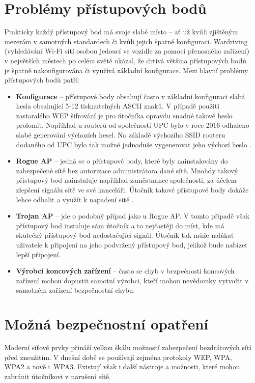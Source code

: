 \section{Problémy přístupových bodů}
Prakticky každý přístupový bod má svoje slabé místo -- ať už kvůli zjištěným mezerám v samotných standardech či kvůli jejich špatné konfiguraci. Wardriving (vyhledávání Wi-Fi sítí osobou jedoucí ve vozidle za pomocí přenosného zařízení) v největších městech po celém světě ukázal, že drtivá většina přístupových bodů je špatně nakonfigurována či využívá základní konfigurace. Mezi hlavní problémy přístupových bodů patří:
\begin{itemize}
  \item{\textbf{Konfigurace} -- přístupové body obsahují často v základní konfiguraci slabá hesla obsahující 5-12 tisknutelných ASCII znaků. V případě použití zastaralého WEP šifrování je pro útočníka opravdu snadné takové heslo prolomit. Například u routerů od společnosti UPC bylo v roce 2016 odhaleno slabé generování výchozích hesel. Na základě výchozího SSID routeru dodaného od UPC bylo tak možné jednoduše vygenerovat jeho výchozí heslo \cite{UPCPassword}.}
  \item{\textbf{Rogue AP} -- jedná se o přístupové body, které byly nainstalovány do zabezpečené sítě bez autorizace administrátora dané sítě. Mnohdy takový přístupový bod nainstaluje například zaměstnanec společnosti, za účelem zlepšení signálu sítě ve své kanceláři. Útočník takové přístupové body dokáže lehce odhalit a využít k napadení sítě \cite{beyah2004rogue}.}
  \item{\textbf{Trojan AP} -- jde o podobný případ jako u Rogue AP. V tomto případě však přístupový bod instaluje sám útočník a to nejčastěji do míst, kde má skutečný přístupový bod nedostačující signál. Útočník tak může nalákat uživatele k připojení na jeho podvržený přístupový bod, jelikož bude nabízet lepší připojení.}
  \item{\textbf{Výrobci koncových zařízení} -- často se chyb v bezpečnosti koncových zařízení mohou dopustit samotní výrobci, kteří mohou nevědomky vytvořit v samotném zařízení bezpečnostní chybu.}
\end{itemize}

\section{Možná bezpečnostní opatření}
Moderní síťové prvky přináší velkou škálu možností zabezpečení bezdrátových sítí před zneužitím. V dnešní době se používají zejména protokoly WEP, WPA, WPA2 a nově i~WPA3. Existují však i další nástroje a možnosti, které mohou zabránit útočníkovi v narušení sítě.


